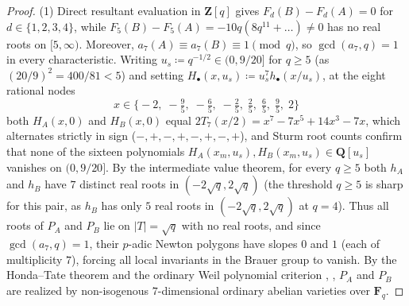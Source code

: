 \documentclass[11pt]{amsart}
\theoremstyle{remark}
\newcommand{\F}{\mathbf{F}}
\newcommand{\Z}{\mathbf{Z}}
\newcommand{\Q}{\mathbf{Q}}
\begin{document}
\begin{proof}
(1) Direct resultant evaluation in $\Z[q]$ gives $F_d(B) - F_d(A) = 0$ for $d \in \{1, 2, 3, 4\}$, while $F_5(B) - F_5(A) = -10 q (8 q^{11} + \dots) \ne 0$ has no real roots on $[5, \infty)$. Moreover, $a_7(A) \equiv a_7(B) \equiv 1 \pmod{q}$, so $\gcd(a_7, q) = 1$ in every characteristic. Writing $u_s \coloneqq q^{-1/2} \in (0, 9/20]$ for $q \ge 5$ (as $(20/9)^2 = 400/81 < 5$) and setting $H_\bullet(x, u_s) \coloneqq u_s^7 h_\bullet(x/u_s)$, at the eight rational nodes
\[
x \in \bigl\{-2,\; -\tfrac{9}{5},\; -\tfrac{6}{5},\; -\tfrac{2}{5},\; \tfrac{2}{5},\; \tfrac{6}{5},\; \tfrac{9}{5},\; 2\bigr\}
\]
both $H_A(x, 0)$ and $H_B(x, 0)$ equal $2 T_7(x/2) = x^7 - 7 x^5 + 14 x^3 - 7 x$, which alternates strictly in sign ($-, +, -, +, -, +, -, +$), and Sturm root counts confirm that none of the sixteen polynomials $H_A(x_m, u_s), H_B(x_m, u_s) \in \Q[u_s]$ vanishes on $(0, 9/20]$. By the intermediate value theorem, for every $q \ge 5$ both $h_A$ and $h_B$ have $7$ distinct real roots in $(-2\sqrt{q}, 2\sqrt{q})$ (the threshold $q \ge 5$ is sharp for this pair, as $h_B$ has only $5$ real roots in $(-2\sqrt{q}, 2\sqrt{q})$ at $q = 4$). Thus all roots of $P_A$ and $P_B$ lie on $|T| = \sqrt{q}$ with no real roots, and since $\gcd(a_7, q) = 1$, their $p$-adic Newton polygons have slopes $0$ and $1$ (each of multiplicity $7$), forcing all local invariants in the Brauer group to vanish. By the Honda--Tate theorem \cite{Hon68,Tat71} and the ordinary Weil polynomial criterion \cite[\S7]{Wat69}, \cite[\S3]{How95}, $P_A$ and $P_B$ are realized by non-isogenous $7$-dimensional ordinary abelian varieties over $\F_q$.


\end{proof}
\end{document}
